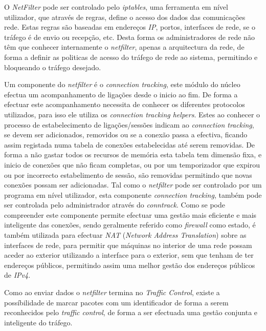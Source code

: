 O \textit{NetFilter} pode ser controlado pelo \textit{iptables}, uma ferramenta em nível utilizador, que através de regras, define o acesso dos dados das comunicações rede.
Estas regras são baseadas em endereços \textit{IP}, portos, interfaces de rede, se o tráfego é de envio ou recepção, etc.
Desta forma os administradores de rede não têm que conhecer internamente o \textit{netfilter}, apenas a arquitectura da rede, de forma a definir as politicas de acesso do tráfego de rede ao sistema, permitindo e bloqueando o tráfego desejado.

Um componente do \textit{netfilter} é o \textit{connection tracking}, este módulo do núcleo efectua um acompanhamento de ligações desde o inicio ao fim.
De forma a efectuar este acompanhamento necessita de conhecer os diferentes protocolos utilizados, para isso ele utiliza os \textit{connection tracking helpers}.
Estes ao conhecer o processo de estabelecimento de ligações/sessões indicam ao \textit{connection tracking}, se devem ser adicionados, removidos ou se a conexão passa a efectiva, ficando assim registada numa tabela de conexões estabelecidas até serem removidas.
De forma a não gastar todos os recursos de memória esta tabela tem dimensão fixa, e inicio de conexões que não ficam completas, ou por um temporizador que expirou ou por incorrecto estabelimento de sessão, são removidas permitindo que novas conexões possam ser adicionadas.
Tal como o \textit{netfilter} pode ser controlado por um programa em nível utilizador, esta componente \textit{connection tracking}, também pode ser controlada pelo administrador através do \textit{conntrack}.
Como se pode compreender este componente permite efectuar uma gestão mais eficiente e mais inteligente das conexões, sendo geralmente referido como \textit{firewall} como estado, é também utilizada para efectuar \textit{NAT} (\textit{Network Address Translation}) sobre as interfaces de rede, para permitir que máquinas no interior de uma rede possam aceder ao exterior utilizando a interface para o exterior, sem que tenham de ter endereços públicos, permitindo assim uma melhor gestão dos endereços públicos de \textit{IPv4}.

Como ao enviar dados o \textit{netfilter} termina no \textit{Traffic Control}, existe a possíbilidade de marcar pacotes com um identificador de forma a serem reconhecidos pelo \textit{traffic control}, de forma a ser efectuada uma gestão conjunta e inteligente do tráfego.

